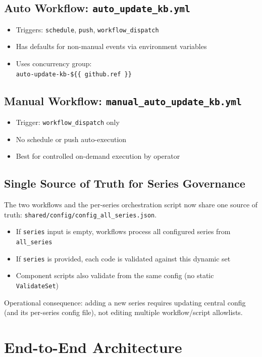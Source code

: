 \documentclass[11pt,a4paper]{article}
\begin{document}
\subsection{Auto Workflow: \texttt{auto\_update\_kb.yml}}
\begin{itemize}
  \item Triggers: \texttt{schedule}, \texttt{push}, \texttt{workflow\_dispatch}
  \item Has defaults for non-manual events via environment variables
  \item Uses concurrency group:\\
  \texttt{auto-update-kb-\$\{\{ github.ref \}\}}
\end{itemize}

\subsection{Manual Workflow: \texttt{manual\_auto\_update\_kb.yml}}
\begin{itemize}
  \item Trigger: \texttt{workflow\_dispatch} only
  \item No schedule or push auto-execution
  \item Best for controlled on-demand execution by operator
\end{itemize}

\subsection{Single Source of Truth for Series Governance}
The two workflows and the per-series orchestration script now share one source of truth:
\texttt{shared/config/config\_all\_series.json}.

\begin{itemize}
  \item If \texttt{series} input is empty, workflows process all configured series from \texttt{all\_series}
  \item If \texttt{series} is provided, each code is validated against this dynamic set
  \item Component scripts also validate from the same config (no static \texttt{ValidateSet})
\end{itemize}

Operational consequence: adding a new series requires updating central config (and its per-series config file), not editing multiple workflow/script allowlists.

\section{End-to-End Architecture}
\end{document}
